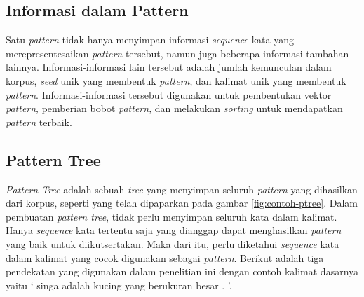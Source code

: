 \subsection{Informasi dalam Pattern}
Satu \textit{pattern} tidak hanya menyimpan informasi \textit{sequence} kata yang merepresentesaikan \textit{pattern} tersebut, namun juga beberapa informasi tambahan lainnya. Informasi-informasi lain tersebut adalah jumlah kemunculan dalam korpus, \textit{seed} unik yang membentuk \textit{pattern}, dan kalimat unik yang membentuk \textit{pattern}. Informasi-informasi tersebut digunakan untuk pembentukan vektor \textit{pattern}, pemberian bobot \textit{pattern}, dan melakukan \textit{sorting} untuk mendapatkan \textit{pattern} terbaik.

\subsection{Pattern Tree}
\textit{Pattern Tree} adalah sebuah \textit{tree} yang menyimpan seluruh \textit{pattern} yang dihasilkan dari korpus, seperti yang telah dipaparkan pada gambar \ref{fig:contoh-ptree}. Dalam pembuatan \textit{pattern tree}, tidak perlu menyimpan seluruh kata dalam kalimat. Hanya \textit{sequence} kata tertentu saja yang dianggap dapat menghasilkan \textit{pattern} yang baik untuk diikutsertakan. Maka dari itu, perlu diketahui \textit{sequence} kata dalam kalimat yang cocok digunakan sebagai \textit{pattern}. Berikut adalah tiga pendekatan yang digunakan dalam penelitian ini dengan contoh kalimat dasarnya yaitu `{\tagStart} {\tagHyponym}singa{\tagHyponym} adalah {\tagHypernym}kucing{\tagHypernym} yang berukuran besar . {\tagEnd}'.

